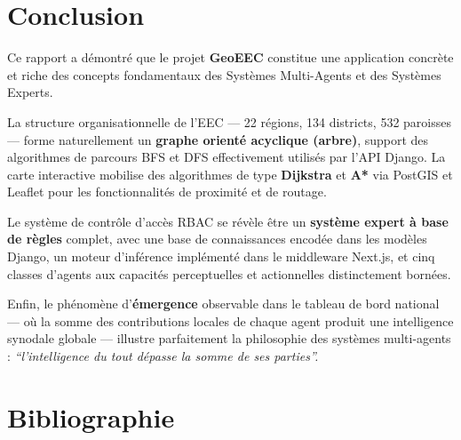 \documentclass[12pt, a4paper]{report}
\theoremstyle{definition}
\begin{document}
\chapter*{Conclusion}

Ce rapport a démontré que le projet \textbf{GeoEEC} constitue une application concrète et riche des concepts fondamentaux des Systèmes Multi-Agents et des Systèmes Experts.

La structure organisationnelle de l'EEC — 22 régions, 134 districts, 532 paroisses — forme naturellement un \textbf{graphe orienté acyclique (arbre)}, support des algorithmes de parcours BFS et DFS effectivement utilisés par l'API Django. La carte interactive mobilise des algorithmes de type \textbf{Dijkstra} et \textbf{A*} via PostGIS et Leaflet pour les fonctionnalités de proximité et de routage.

Le système de contrôle d'accès RBAC se révèle être un \textbf{système expert à base de règles} complet, avec une base de connaissances encodée dans les modèles Django, un moteur d'inférence implémenté dans le middleware Next.js, et cinq classes d'agents aux capacités perceptuelles et actionnelles distinctement bornées.

Enfin, le phénomène d'\textbf{émergence} observable dans le tableau de bord national — où la somme des contributions locales de chaque agent produit une intelligence synodale globale — illustre parfaitement la philosophie des systèmes multi-agents : \textit{``l'intelligence du tout dépasse la somme de ses parties''.}

\chapter*{Bibliographie}
\end{document}
